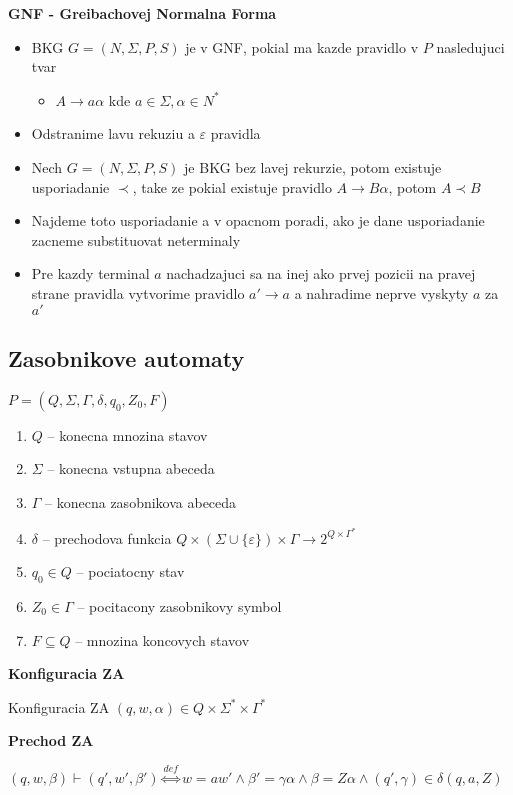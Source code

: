 \documentclass[12pt]{article}
\begin{document}
\textbf{GNF - Greibachovej Normalna Forma}
\begin{itemize}
	\item BKG $G = (N, \Sigma, P, S)$ je v GNF, pokial ma kazde pravidlo v $P$ nasledujuci tvar
	\begin{itemize}
		\item $A \to a\alpha$ kde $a \in \Sigma, \alpha \in N^{*}$
	\end{itemize}
	\item Odstranime lavu rekuziu a $\varepsilon$ pravidla
	\item Nech $G = (N, \Sigma, P, S)$ je BKG bez lavej rekurzie, potom existuje usporiadanie $\prec$, take ze
		pokial existuje pravidlo $A \to B\alpha$, potom $A \prec B$
	\item Najdeme toto usporiadanie a v opacnom poradi, ako je dane usporiadanie zacneme substituovat neterminaly
	\item Pre kazdy terminal $a$ nachadzajuci sa na inej ako prvej pozicii na pravej strane pravidla vytvorime pravidlo
		$a' \to a$ a nahradime neprve vyskyty $a$ za $a'$
\end{itemize}

\subsection*{Zasobnikove automaty}
$P = (Q,\Sigma,\Gamma,\delta,q_{0},Z_{0},F)$
\begin{enumerate}
	\item $Q$ -- konecna mnozina stavov
	\item $\Sigma$ -- konecna vstupna abeceda
	\item $\Gamma$ -- konecna zasobnikova abeceda
	\item $\delta$ -- prechodova funkcia $Q \times (\Sigma \cup \{\varepsilon\}) \times \Gamma \to 2^{Q \times \Gamma^{*}}$
	\item $q_{0} \in Q$ -- pociatocny stav
	\item $Z_{0} \in \Gamma$ -- pocitacony zasobnikovy symbol
	\item $F \subseteq Q$ -- mnozina koncovych stavov
\end{enumerate}

\textbf{Konfiguracia ZA}

Konfiguracia ZA $(q,w,\alpha) \in Q \times \Sigma^{*} \times \Gamma^{*}$

\textbf{Prechod ZA}

$(q,w,\beta) \vdash (q',w',\beta') \overset{def}{\Leftrightarrow} w = aw' \land \beta' = \gamma\alpha \land \beta = Z\alpha \land (q',\gamma) \in \delta(q,a,Z)$
\end{document}
